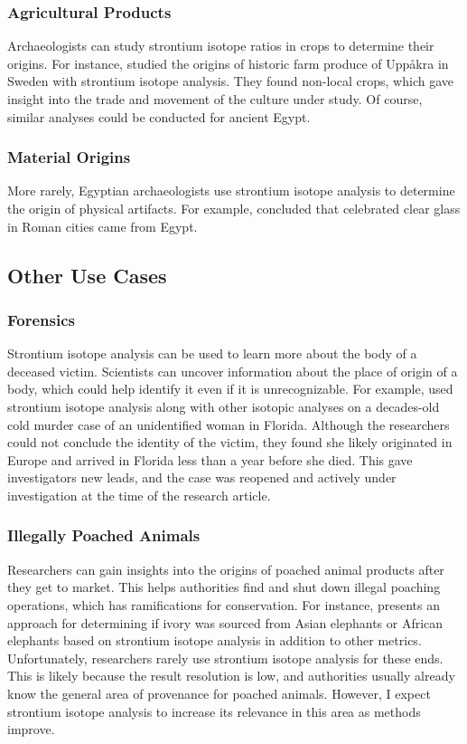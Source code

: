 \documentclass[a4paper, 12pt]{article}
\begin{document}
\subsubsection{Agricultural Products}
Archaeologists can study strontium isotope ratios in crops to determine their origins.
For instance, \cite{larsson2020} studied the
origins of historic farm produce of Uppåkra in Sweden with strontium isotope analysis.
They found non-local crops, which
gave insight into the trade and movement of the culture under study.
Of course, similar analyses could be conducted for ancient Egypt.


\subsubsection{Material Origins}
More rarely, Egyptian archaeologists use strontium isotope analysis to determine the origin
of physical artifacts. For example, \cite{barfod2020} concluded that celebrated
clear glass in Roman cities came from Egypt.



\subsection{Other Use Cases}
\subsubsection{Forensics}
Strontium isotope analysis can be used to learn more about the body of a
deceased victim. Scientists can uncover information about the place of origin
of a body, which could help identify it even if it is unrecognizable. For example,
\cite{kamenov2014} used strontium isotope analysis along with other isotopic
analyses on a decades-old cold murder case of an unidentified woman in Florida.
Although the researchers could not conclude the identity of the victim, they
found she likely originated in Europe and arrived in Florida less than a year
before she died. This gave investigators new leads, and the case was
reopened and actively under investigation at the time of the research article.


\subsubsection{Illegally Poached Animals}
Researchers can gain insights into the origins of poached animal products after
they get to market. This helps authorities find and shut down illegal poaching
operations, which has ramifications for conservation. For instance, \cite{singh2006}
presents an approach for determining if ivory was sourced from Asian elephants or African elephants based
on strontium isotope analysis in addition to other metrics.
Unfortunately, researchers rarely use
strontium isotope analysis for these ends. This is likely because the result resolution is low,
and authorities usually already know the general area of provenance for poached animals.
However, I expect strontium isotope analysis to increase its relevance in this
area as methods improve.
\end{document}
